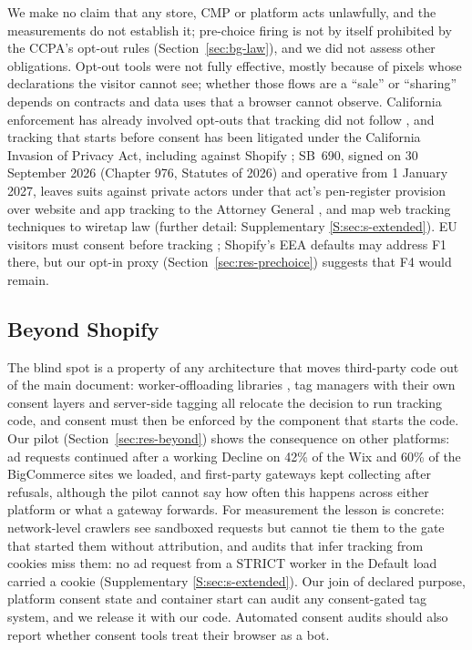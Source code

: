 We make no claim that any store, CMP or platform acts unlawfully, and the measurements do not establish it; pre-choice firing is not by itself prohibited by the CCPA's opt-out rules (Section~\ref{sec:bg-law}), and we did not assess other obligations. Opt-out tools were not fully effective, mostly because of pixels whose declarations the visitor cannot see; whether those flows are a ``sale'' or ``sharing'' depends on contracts and data uses that a browser cannot observe. California enforcement has already involved opt-outs that tracking did not follow \citep{cppa2025toddsnyder,caag2025healthline,cppa2025tractorsupply}, and tracking that starts before consent has been litigated under the California Invasion of Privacy Act, including against Shopify \citep{briskin2025shopify,briskin2026remand}; SB~690, signed on 30 September 2026 (Chapter 976, Statutes of 2026) and operative from 1 January 2027, leaves suits against private actors under that act's pen-register provision over website and app tracking to the Attorney General \citep{leginfo2026sb690,duanemorris2026sb690}, and \citet{munir2025keystroke} map web tracking techniques to wiretap law (further detail: Supplementary \ref*{S:sec:s-extended}). EU visitors must consent before tracking \citep{eprivacy2002,edpb2023guidelines}; Shopify's EEA defaults may address F1 there, but our opt-in proxy (Section~\ref{sec:res-prechoice}) suggests that F4 would remain.

\subsection{Beyond Shopify}\label{sec:disc-beyond}

The blind spot is a property of any architecture that moves third-party code out of the main document: worker-offloading libraries \citep{partytown}, tag managers with their own consent layers \citep{mertens2025gtm} and server-side tagging \citep{bottger2026fpt,jazlan2026sstguard} all relocate the decision to run tracking code, and consent must then be enforced by the component that starts the code. Our pilot (Section~\ref{sec:res-beyond}) shows the consequence on other platforms: ad requests continued after a working Decline on 42\% of the Wix and 60\% of the BigCommerce sites we loaded, and first-party gateways kept collecting after refusals, although the pilot cannot say how often this happens across either platform or what a gateway forwards. For measurement the lesson is concrete: network-level crawlers see sandboxed requests but cannot tie them to the gate that started them without attribution, and audits that infer tracking from cookies \citep{bollinger2022automating,rasaii2025intractable,libert2026webxray} miss them: no ad request from a STRICT worker in the Default load carried a cookie (Supplementary \ref*{S:sec:s-extended}). Our join of declared purpose, platform consent state and container start can audit any consent-gated tag system, and we release it with our code. Automated consent audits should also report whether consent tools treat their browser as a bot.
